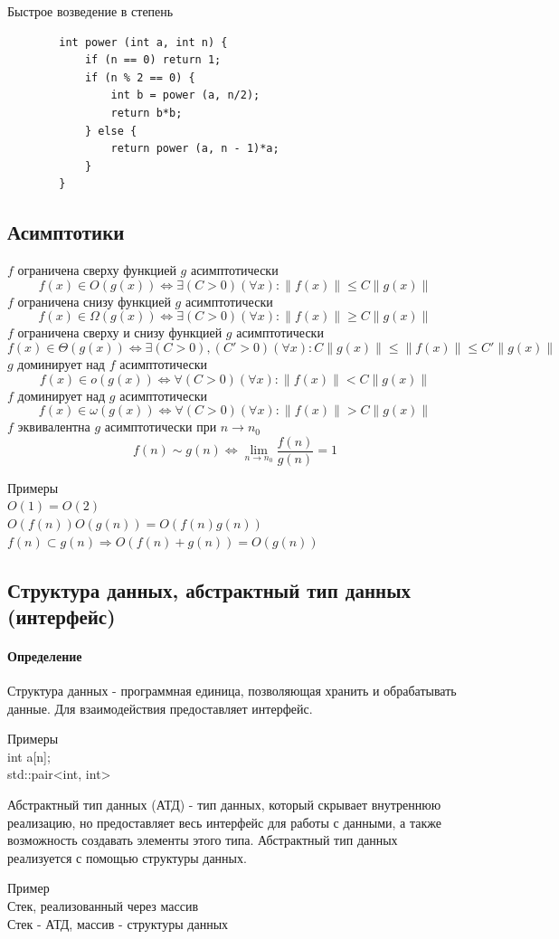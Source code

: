 \documentclass[a4paper,10pt]{article}
\begin{document}
	\begin{center}
		Быстрое возведение в степень
	\end{center}
	\begin{lstlisting}
		int power (int a, int n) {
			if (n == 0) return 1;
			if (n % 2 == 0) {
				int b = power (a, n/2);
				return b*b;
			} else {
				return power (a, n - 1)*a;
			}
		}
	\end{lstlisting}
	\newpage
	\subsection{Асимптотики}
	$f$ ограничена сверху функцией $g$ асимптотически
	\[
		f(x) \in O(g(x)) \Leftrightarrow \exists (C>0)  (\forall x) \colon \| f(x) \| \leq C \| g(x) \|
	\]
	$f$ ограничена снизу функцией $g$ асимптотически
	\[
		f(x) \in \Omega(g(x)) \Leftrightarrow \exists (C>0)  (\forall x) \colon \| f(x) \| \geq C \| g(x) \|
	\]
	$f$ ограничена сверху и снизу функцией $g$ асимптотически
	\[
		f(x) \in \Theta(g(x)) \Leftrightarrow \exists (C > 0),(C' > 0) (\forall x) \colon C \|g(x)\| \leq \|f(x)\| \leq C' \|g(x)\|
	\]
	$g$ доминирует над $f$ асимптотически
	\[
		f(x) \in o(g(x)) \Leftrightarrow \forall(C > 0) (\forall x) \colon \| f(x) \| < C \| g(x) \|
	\]
	$f$ доминирует над $g$ асимптотически
	\[
		f(x) \in \omega(g(x)) \Leftrightarrow \forall(C > 0) (\forall x) \colon \| f(x) \| > C \| g(x) \|
	\]
	$f$  эквивалентна $g$ асимптотически при $n \rightarrow n_0$
	\[
		f(n) \sim g(n) \Leftrightarrow \lim_{n \to n_0} \frac{f(n)}{g(n)} = 1
	\]
	
	\begin{center}
		Примеры \\
		$O(1) = O(2)$ \\
		$O(f(n))O(g(n)) = O(f(n)g(n))$ \\
		$f(n) \subset g(n) \Rightarrow O(f(n) + g(n)) = O(g(n))$
	\end{center}
	
	\subsection{Структура данных, абстрактный тип данных (интерфейс)}
	\paragraph{Определение} Структура данных - программная единица, позволяющая хранить и обрабатывать данные. Для взаимодействия предоставляет интерфейс.
	\begin{center}
		Примеры \\
		int a[n]; \\
		std::pair<int, int> \\
	\end{center}
	Абстрактный тип данных (АТД) - тип данных, который скрывает внутреннюю реализацию, но предоставляет весь интерфейс для работы с данными, а также возможность создавать элементы этого типа. Абстрактный тип данных реализуется с помощью структуры данных.
	\begin{center}
		Пример \\
		Стек, реализованный через массив \\
		Стек - АТД, массив - структуры данных
	\end{center}
	\newpage
\end{document}
